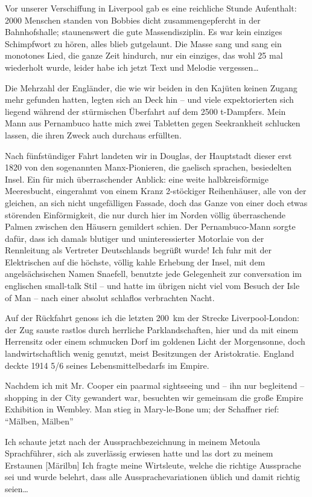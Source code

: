 \documentclass[a5paper,pagesize,10pt,twoside=true]{scrbook}
\begin{document}
Vor unserer Verschiffung in Liverpool gab es eine reichliche Stunde Aufenthalt: \num{2000} Menschen standen von Bobbies dicht zusammengepfercht in der Bahnhofshalle; staunenswert die gute Massendisziplin. Es war kein einziges Schimpfwort zu hören, alles blieb gutgelaunt. Die Masse sang und sang ein monotones Lied, die ganze Zeit hindurch, nur ein einziges, das wohl 25 mal wiederholt wurde, leider habe ich jetzt Text und Melodie vergessen\dots

Die Mehrzahl der Engländer, die wie wir beiden in den Kajüten keinen Zugang mehr gefunden hatten, legten sich an Deck hin -- und viele expektorierten sich liegend während der stürmischen Überfahrt auf dem 2500 t-Dampfers. Mein Mann aus Pernambuco hatte mich zwei Tabletten gegen Seekrankheit schlucken lassen, die ihren Zweck auch durchaus erfüllten.

Nach fünfstündiger Fahrt landeten wir in Douglas, der Hauptstadt dieser erst 1820 von den sogenannten Manx-Pionieren, die gaelisch sprachen, besiedelten Insel. Ein für mich überraschender Anblick: eine weite halbkreisförmige Meeresbucht, eingerahmt von einem Kranz 2-stöckiger Reihenhäuser, alle von der gleichen, an sich nicht ungefälligen Fassade, doch das Ganze von einer doch etwas störenden Einförmigkeit, die nur durch hier im Norden völlig überraschende Palmen zwischen den Häusern gemildert schien. Der Pernambuco-Mann sorgte dafür, dass ich damals blutiger und uninteressierter Motorlaie von der Rennleitung als Vertreter Deutschlands begrüßt wurde! Ich fuhr mit der Elektrischen auf die höchste, völlig kahle Erhebung der Insel, mit dem angelsächsischen Namen Snaefell, benutzte jede Gelegenheit zur conversation im englischen small-talk Stil -- und hatte im übrigen nicht viel vom Besuch der Isle of Man -- nach einer absolut schlaflos verbrachten Nacht.

Auf der Rückfahrt genoss ich die letzten 200~km der Strecke Liverpool-London: der Zug sauste rastlos durch herrliche Parklandschaften, hier und da mit einem Herrensitz oder einem schmucken Dorf im goldenen Licht der Morgensonne, doch landwirtschaftlich wenig genutzt, meist Besitzungen der Aristokratie. England deckte 1914 5/6 seines Lebensmittelbedarfs im Empire.

Nachdem ich mit Mr. Cooper ein paarmal sightseeing und -- ihn nur begleitend -- shopping in der City gewandert war, besuchten wir gemeinsam die große Empire Exhibition in Wembley. Man stieg in Mary-le-Bone um; der Schaffner rief: \enquote{Mälben, Mälben}

Ich schaute jetzt nach der Aussprachbezeichnung in meinem Metoula Sprachführer, sich als zuverlässig erwiesen hatte und las dort zu meinem Erstaunen [Märilbn] Ich fragte meine Wirtsleute, welche die richtige Aussprache sei und wurde belehrt, dass alle Aussprachevariationen üblich und damit richtig seien\dots
\end{document}
